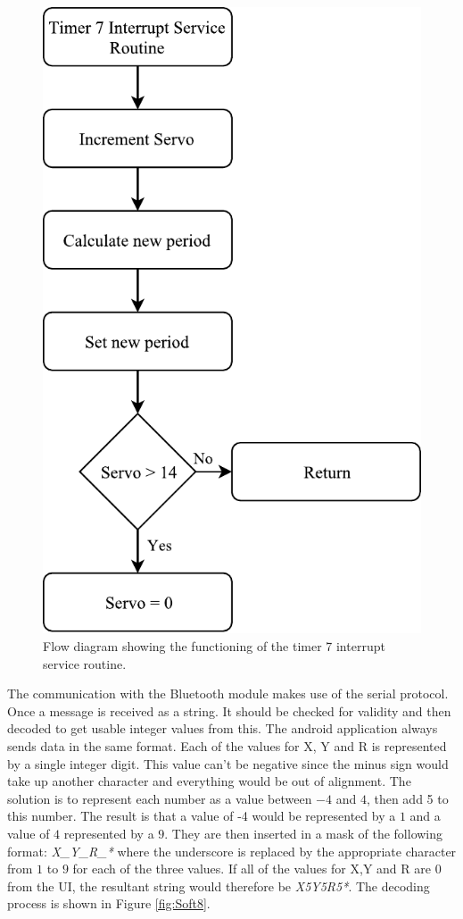 \begin{figure}[H]
\centering
\includegraphics[scale = 1]{pics/Soft7.pdf}
\caption{Flow diagram showing the functioning of the timer 7 interrupt service routine.}
\label{fig:Soft7}
\end{figure}

The communication with the Bluetooth module makes use of the serial protocol. Once a message is received as a string. It should be checked for validity and then decoded to get usable integer values from this. The android application always sends data in the same format. Each of the values for X, Y and R is represented by a single integer digit. This value can't be negative since the minus sign would take up another character and everything would be out of alignment. The solution is to represent each number as a value between $-4$ and $4$, then add 5 to this number. The result is that a value of -4 would be represented by a $1$ and a value of $4$ represented by a $9$. They are then inserted in a mask of the following format: \textit{X\_Y\_R\_*} where the underscore is replaced by the appropriate character from $1$ to $9$ for each of the three values. If all of the values for X,Y and R are 0 from the UI, the resultant string would therefore be \textit{X5Y5R5*}. The decoding process is shown in Figure \ref{fig:Soft8}.\\

